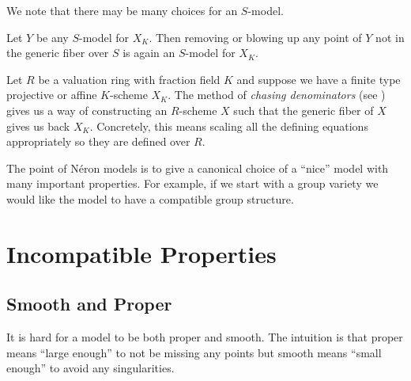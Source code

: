 \documentclass[11pt]{article}
\newcommand{\neron}{N\'{e}ron }
\begin{document}
We note that there may be many choices for an $S$-model.

\begin{ex}
	Let $Y$ be any $S$-model for $X_K$. Then removing or blowing up any point of $Y$ not in the generic fiber over $S$ is again an $S$-model for $X_K$.
\end{ex}

\begin{ex}
	Let $R$ be a valuation ring with fraction field $K$ and suppose we have a finite type projective or affine $K$-scheme $X_K$. The method of \emph{chasing denominators} (see \cite[Ch.~1.1]{bosch2012neron}) gives us a way of constructing an $R$-scheme $X$ such that the generic fiber of $X$ gives us back $X_K$. Concretely, this means scaling all the defining equations appropriately so they are defined over $R$.
\end{ex}

The point of \neron models is to give a canonical choice of a ``nice'' model with many important properties. For example, if we start with a group variety we would like the model to have a compatible group structure.

\section{Incompatible Properties}

\subsection{Smooth and Proper}

It is hard for a model to be both proper and smooth. The intuition is that proper means ``large enough'' to not be missing any points but smooth means ``small enough'' to avoid any singularities.
\end{document}
